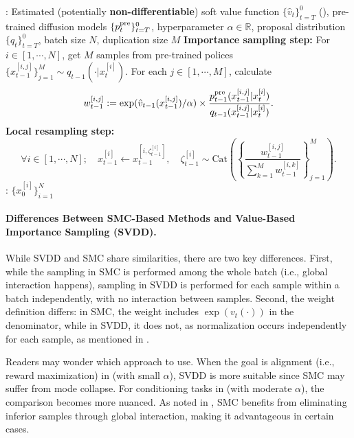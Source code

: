 \begin{algorithm}[!th]
\caption{Value-Based Importance Sampling (SVDD)~\citep{li2024derivative}}\label{alg:decoding2}
\begin{algorithmic}[1]
     : Estimated (potentially \textbf{non-differentiable}) soft value function $\{\hat v_t\}_{t=T}^0$ (), pre-trained diffusion models $\{p^{\mathrm{pre}}_t\}_{t=T}^0$, hyperparameter $\alpha \in \mathbb{R}$, proposal distribution $\{q_t\}_{t=T}^0$, batch size $N$, duplication size $M$
      \STATE \textbf{Importance sampling step:} For $i\in [1,\cdots,N]$, get $M$ samples from pre-trained polices $\{x^{[i,j]}_{t-1}\}_{j=1}^{M} \sim q_{t-1}(\cdot| x^{[i]}_{t}) $. For each $j\in [1,\cdots,M]$, calculate  $$ w^{[i,j]}_{t-1}:=  \exp(\hat v_{t-1}(x^{[i,j]}_{t-1})/\alpha)\times \frac{p^{\mathrm{pre}}_{t-1}(x^{[i,j]}_{t-1}| x^{[i]}_{t}) }{q_{t-1}(x^{[i,j]}_{t-1}| x^{[i]}_{t})}.$$ \label{line:select3}
        \STATE \textbf{Local resampling step:} $$ \forall i\in [1,\cdots,N];\quad x^{[i]}_{t-1}    \leftarrow  x^{[i, \zeta^{[i]}_{t-1} ]}_{t-1},\quad \zeta^{[i]}_{t-1}  \sim \mathrm{Cat}\left ( \left \{\frac{w^{[i,j]}_{t-1}}{\sum_{k=1}^{M} w^{[i,k]}_{t-1} } \right \}_{j=1}^{M} \right).$$ \label{line:select}
     \ENDFOR
  : $\{x^{[i]}_0\}_{i=1}^N$
\end{algorithmic}
\end{algorithm}


\paragraph{Differences Between SMC-Based Methods and Value-Based Importance Sampling (SVDD).}

While SVDD and SMC share similarities, there are two key differences. First, while the sampling in SMC is performed among the whole batch (i.e., global interaction happens), sampling in SVDD is performed for each sample within a batch independently, with no interaction between samples. Second, the weight definition differs: in SMC, the weight includes $\exp(v_t(\cdot))$  in the denominator, while in SVDD, it does not, as normalization occurs independently for each sample, as mentioned in . 

{ Readers may wonder which approach to use. When the goal is alignment (i.e., reward maximization) in  (with small $\alpha$), SVDD is more suitable since SMC may suffer from mode collapse. For conditioning tasks in  (with moderate $\alpha$), the comparison becomes more nuanced.} As noted in , SMC benefits from eliminating inferior samples through global interaction, making it advantageous in certain cases. 

